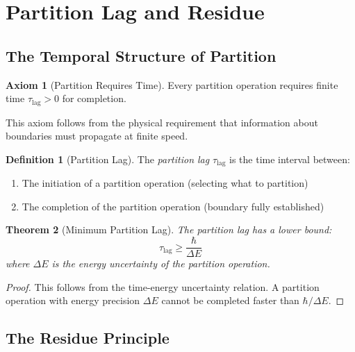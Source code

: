 \documentclass[twocolumn,10pt,a4paper]{article}
\newtheorem{theorem}{Theorem}[section]
\theoremstyle{definition}
\newtheorem{definition}[theorem]{Definition}
\newtheorem{axiom}{Axiom}
\theoremstyle{remark}
\newcommand{\Lag}{\tau_{\mathrm{lag}}}
\begin{document}
\section{Partition Lag and Residue}
\label{sec:partition_lag}

\subsection{The Temporal Structure of Partition}

\begin{axiom}[Partition Requires Time]
\label{ax:partition_time}
Every partition operation requires finite time $\Lag > 0$ for completion.
\end{axiom}

This axiom follows from the physical requirement that information about boundaries must propagate at finite speed.

\begin{definition}[Partition Lag]
\label{def:lag}
The \emph{partition lag} $\Lag$ is the time interval between:
\begin{enumerate}
    \item The initiation of a partition operation (selecting what to partition)
    \item The completion of the partition operation (boundary fully established)
\end{enumerate}
\end{definition}

\begin{theorem}[Minimum Partition Lag]
\label{thm:min_lag}
The partition lag has a lower bound:
\begin{equation}
    \Lag \geq \frac{\hbar}{\Delta E}
\end{equation}
where $\Delta E$ is the energy uncertainty of the partition operation.
\end{theorem}

\begin{proof}
This follows from the time-energy uncertainty relation. A partition operation with energy precision $\Delta E$ cannot be completed faster than $\hbar/\Delta E$.
\end{proof}

\subsection{The Residue Principle}
\end{document}
